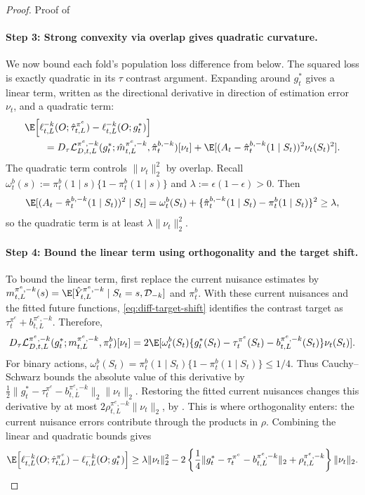 \documentclass[opre,nonblindrev]{informs4}
\providecommand{\cD}{\mathcal D}
\newcommand{\norm}[1]{\lVert#1\rVert}
\newcommand{\blipadv}{\tau}
\begin{document}
\begin{proof}{Proof of }
\paragraph{Step 3: Strong convexity via overlap gives quadratic curvature.}
We now bound each fold's population loss difference from below.
The squared loss is exactly quadratic in its $\blipadv$ contrast argument. Expanding
around $g_t^*$ gives a linear term, written as the directional derivative
in direction of estimation error $\nu_t$, and a quadratic term:
\begin{align*}
&\E\!\left[
\ell_{t,L}^{-k}(O;\hat\blipadv_{t,L}^{\pi^e})
-\ell_{t,L}^{-k}(O;g_t^*)\right]\\
&\qquad=
D_{\blipadv}\mathcal L_{D,t,L}^{\pi^e,-k}
(g_t^*;\hat m_{t,L}^{\pi^e,-k},
\hat\pi_t^{b,-k})[\nu_t]
+\E[(A_t-\hat\pi_t^{b,-k}(1\mid S_t))^2
\nu_t(S_t)^2].
\end{align*}
The quadratic term controls $\norm{\nu_t}_2^2$ by overlap.
Recall $\omega_t^b(s):=\pi_t^b(1\mid s)\{1-\pi_t^b(1\mid s)\}$
and $\lambda:=\epsilon(1-\epsilon)>0$. Then
\[
\E[(A_t-\hat\pi_t^{b,-k}(1\mid S_t))^2
\mid S_t]
=\omega_t^b(S_t)
+\{\hat\pi_t^{b,-k}(1\mid S_t)
-\pi_t^b(1\mid S_t)\}^2
\geq\lambda,
\]
so the quadratic term is at least $\lambda\norm{\nu_t}_2^2$.
\paragraph{Step 4: Bound the linear term using orthogonality and the target shift.}
To bound the linear term, first replace the current nuisance estimates by
$m_{t,L}^{\pi^e,-k}(s)=\E[\hat Y_{t,L}^{\pi^e,-k}\mid S_t=s,\cD_{-k}]$
and $\pi_t^b$. With these current nuisances and the fitted future functions,
\cref{eq:diff-target-shift} identifies the contrast target as
$\blipadv_t^{\pi^e}+b_{t,L}^{\pi^e,-k}$. Therefore,
\[
D_{\blipadv}\mathcal L_{D,t,L}^{\pi^e,-k}
(g_t^*;m_{t,L}^{\pi^e,-k},\pi_t^b)[\nu_t]
=2\E[\omega_t^b(S_t)
\{g_t^*(S_t)-\blipadv_t^{\pi^e}(S_t)
-b_{t,L}^{\pi^e,-k}(S_t)\}
\nu_t(S_t)].
\]
For binary actions,
$\omega_t^b(S_t)
=\pi_t^b(1\mid S_t)\{1-\pi_t^b(1\mid S_t)\}\leq1/4$.
Thus Cauchy--Schwarz bounds the absolute value of this derivative by
$\frac12\norm{g_t^*-\blipadv_t^{\pi^e}
-b_{t,L}^{\pi^e,-k}}_2\norm{\nu_t}_2$.
Restoring the fitted current nuisances changes this derivative by at most
$2\rho_{t,L}^{\pi^e,-k}\norm{\nu_t}_2$, by
. This is where orthogonality enters:
the current nuisance errors contribute through the products in $\rho$.
Combining the linear and quadratic bounds gives
\[
\E\!\left[\ell_{t,L}^{-k}(O;\hat\blipadv_{t,L}^{\pi^e})
-\ell_{t,L}^{-k}(O;g_t^*)\right]
\geq \lambda\norm{\nu_t}_2^2
-2\left\{\frac14\norm{g_t^*-\blipadv_t^{\pi^e}
-b_{t,L}^{\pi^e,-k}}_2
+\rho_{t,L}^{\pi^e,-k}\right\}\norm{\nu_t}_2.
\]

\end{proof}
\end{document}
